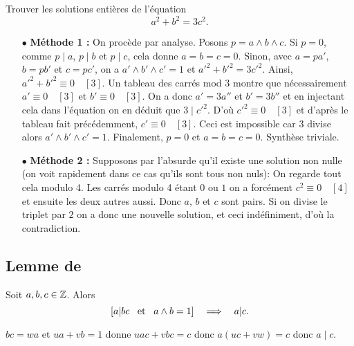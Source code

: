 \documentclass{magnolia}
\begin{document}
\begin{exoUnique}
\exo Trouver les solutions entières de l'équation
  \[a^2+b^2=3c^2.\]
\end{exoUnique}

\begin{sol}
\begin{itemize}
\item[$\bullet$] \textbf{Méthode 1 :} On procède par analyse. Posons $p=a\wedge b \wedge c$. Si $p=0$, comme $p\mid a$, $p\mid b$ et $p\mid c$, cela donne $a=b=c=0$. Sinon, avec $a=pa'$, $b=pb'$ et $c=pc'$, on a $a'\wedge b' \wedge c'=1$ et $a'^2+b'^2=3c'^2$. Ainsi, $a'^2+b'^2\equiv 0 \quad [3]$. Un tableau des carrés mod $3$ montre que nécessairement $a'\equiv 0 \quad [3]$ et $b'\equiv 0 \quad [3]$. On a donc $a'=3a''$ et $b'=3b''$ et en injectant cela dans l'équation on en déduit que $3\mid c'^2$. D'où $c'^2\equiv 0 \quad [3]$ et d'après le tableau fait précédemment, $c'\equiv 0 \quad [3]$. Ceci est impossible car $3$ divise alors $a'\wedge b' \wedge c'=1$. Finalement, $p=0$ et $a=b=c=0$.
Synthèse triviale.
\item[$\bullet$] \textbf{Méthode 2 :}
Supposons par l'absurde qu'il existe une solution non nulle (on voit rapidement dans ce cas qu'ils sont tous non nuls): On regarde tout cela modulo 4. Les carrés modulo 4 étant $0$ ou $1$ on a forcément $c^2 \equiv 0 \quad [4]$ et ensuite les deux autres aussi. Donc $a$, $b$ et $c$ sont pairs. Si on divise le triplet par $2$ on a donc une nouvelle solution, et ceci indéfiniment, d'où la contradiction.
\end{itemize}
\end{sol}

\subsection{Lemme de }

\begin{theoreme}
Soit $a,b,c\in\mathbb{Z}$. Alors
\[\left[a|bc \quad\!\text{et}\quad\! a\wedge b=1\right] \quad\Longrightarrow\quad a|c.\]  
\end{theoreme}

\begin{preuve}
$bc=wa$ et $ua+vb=1$ donne $uac+vbc=c$ donc $a(uc+vw)=c$ donc $a\mid c$.
\end{preuve} 
\end{document}
